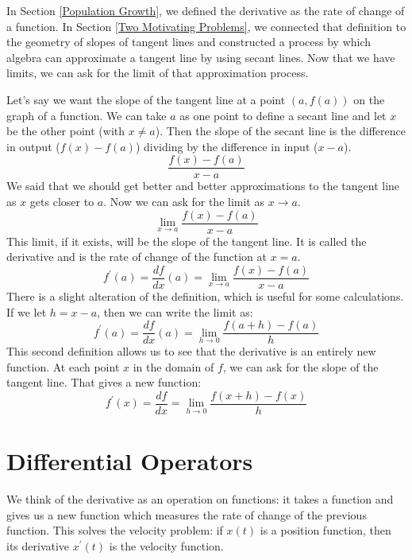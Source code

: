 \documentclass[fleqn]{report}
\begin{document}
In Section \ref{Population Growth}, we defined the derivative
as the rate of change of a function. In Section \ref{Two
Motivating Problems}, we
connected that definition to the geometry of slopes of tangent
lines and constructed a process by which algebra can
approximate a tangent line by using secant lines. Now that we
have limits, we can ask for the limit of that approximation
process.

Let's say we want the slope of the tangent line at a point
$(a,f(a))$ on the graph of a function. We can take $a$ as
one point to define a secant line and let $x$ be the other
point (with $x \neq a$). Then the slope of the secant line is
the difference in output ($f(x) - f(a)$) dividing by the
difference in input ($x-a$). 
\begin{equation*}
\frac{f(x) - f(a)}{x-a}
\end{equation*}
We said that we should get better and better approximations to
the tangent line as $x$ gets closer to $a$. Now we can ask
for the limit as $x \rightarrow a$.
\begin{equation*}
\lim_{x \rightarrow a} \frac{f(x) - f(a)}{x-a}
\end{equation*}
This limit, if it exists, will be the slope of the tangent
line. It is called the derivative and is the rate of change
of the function at $x=a$.
\begin{equation*}
f^\prime(a) = \frac{df}{dx} (a) = \lim_{x \rightarrow a}
\frac{f(x) - f(a)}{x-a} 
\end{equation*}
There is a slight alteration of the definition, which is
useful for some calculations. If we let $h = x-a$, then we can
write the limit as:
\begin{equation*}
f^\prime(a) = \frac{df}{dx} (a) = \lim_{h \rightarrow 0}
\frac{f(a+h) - f(a)}{h} 
\end{equation*}
This second definition allows us to see that the derivative is
an entirely new function. At each point $x$ in the
domain of $f$, we can ask for the slope of the tangent line.
That gives a new function:
\begin{equation*}
f^\prime(x) = \frac{df}{dx} = \lim_{h \rightarrow 0}
\frac{f(x+h) - f(x)}{h} 
\end{equation*}

\section*{Differential Operators}

We think of the derivative as an operation on functions: it
takes a function and gives us a new function which measures
the rate of change of the previous function. This solves the
velocity problem: if $x(t)$ is a position function, then its
derivative $x^\prime(t)$ is the velocity function. 
\end{document}
